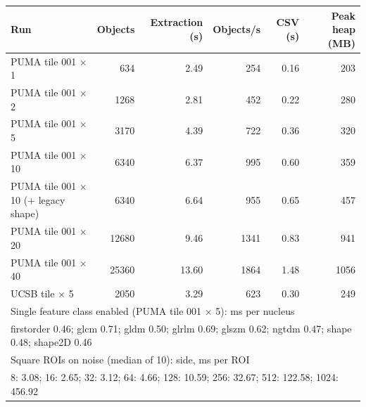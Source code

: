 \begin{tabular}{lrrrrr}
\toprule
Run & Objects & Extraction (s) & Objects/s & CSV (s) & Peak heap (MB) \\
\midrule
PUMA tile 001 $\times$ 1 & 634 & 2.49 & 254 & 0.16 & 203 \\
PUMA tile 001 $\times$ 2 & 1268 & 2.81 & 452 & 0.22 & 280 \\
PUMA tile 001 $\times$ 5 & 3170 & 4.39 & 722 & 0.36 & 320 \\
PUMA tile 001 $\times$ 10 & 6340 & 6.37 & 995 & 0.60 & 359 \\
PUMA tile 001 $\times$ 10 (+ legacy shape) & 6340 & 6.64 & 955 & 0.65 & 457 \\
PUMA tile 001 $\times$ 20 & 12680 & 9.46 & 1341 & 0.83 & 941 \\
PUMA tile 001 $\times$ 40 & 25360 & 13.60 & 1864 & 1.48 & 1056 \\
UCSB tile $\times$ 5 & 2050 & 3.29 & 623 & 0.30 & 249 \\
\midrule
\multicolumn{6}{l}{Single feature class enabled (PUMA tile 001 $\times$ 5): ms per nucleus} \\
\multicolumn{6}{l}{firstorder 0.46; glcm 0.71; gldm 0.50; glrlm 0.69; glszm 0.62; ngtdm 0.47; shape 0.48; shape2D 0.46} \\
\midrule
\multicolumn{6}{l}{Square ROIs on noise (median of 10): side, ms per ROI} \\
\multicolumn{6}{l}{8: 3.08; 16: 2.65; 32: 3.12; 64: 4.66; 128: 10.59; 256: 32.67; 512: 122.58; 1024: 456.92} \\
\bottomrule
\end{tabular}

